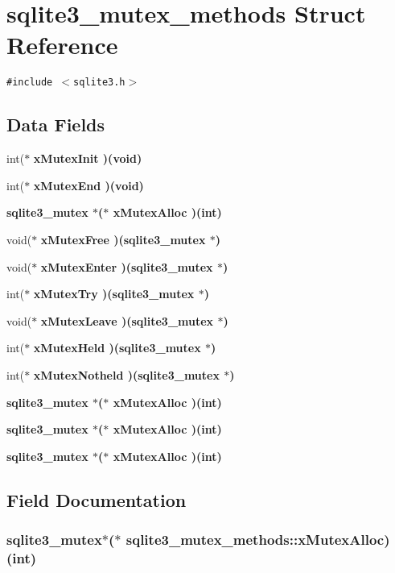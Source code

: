 \section{sqlite3\_\-mutex\_\-methods Struct Reference}
\label{structsqlite3__mutex__methods}
{\tt \#include $<$sqlite3.h$>$}

\subsection*{Data Fields}
\begin{CompactItemize}
\item 
int($\ast$ \bf{x\-Mutex\-Init} )(void)
\item 
int($\ast$ \bf{x\-Mutex\-End} )(void)
\item 
\bf{sqlite3\_\-mutex} $\ast$($\ast$ \bf{x\-Mutex\-Alloc} )(int)
\item 
void($\ast$ \bf{x\-Mutex\-Free} )(\bf{sqlite3\_\-mutex} $\ast$)
\item 
void($\ast$ \bf{x\-Mutex\-Enter} )(\bf{sqlite3\_\-mutex} $\ast$)
\item 
int($\ast$ \bf{x\-Mutex\-Try} )(\bf{sqlite3\_\-mutex} $\ast$)
\item 
void($\ast$ \bf{x\-Mutex\-Leave} )(\bf{sqlite3\_\-mutex} $\ast$)
\item 
int($\ast$ \bf{x\-Mutex\-Held} )(\bf{sqlite3\_\-mutex} $\ast$)
\item 
int($\ast$ \bf{x\-Mutex\-Notheld} )(\bf{sqlite3\_\-mutex} $\ast$)
\item 
\bf{sqlite3\_\-mutex} $\ast$($\ast$ \bf{x\-Mutex\-Alloc} )(int)
\item 
\bf{sqlite3\_\-mutex} $\ast$($\ast$ \bf{x\-Mutex\-Alloc} )(int)
\item 
\bf{sqlite3\_\-mutex} $\ast$($\ast$ \bf{x\-Mutex\-Alloc} )(int)
\end{CompactItemize}


\subsection{Field Documentation}
\subsubsection{\setlength{\rightskip}{0pt plus 5cm}\bf{sqlite3\_\-mutex}$\ast$($\ast$ \bf{sqlite3\_\-mutex\_\-methods::x\-Mutex\-Alloc})(int)}\label{structsqlite3__mutex__methods_b13a3d7ccb791c2c737771c5be49d002}


